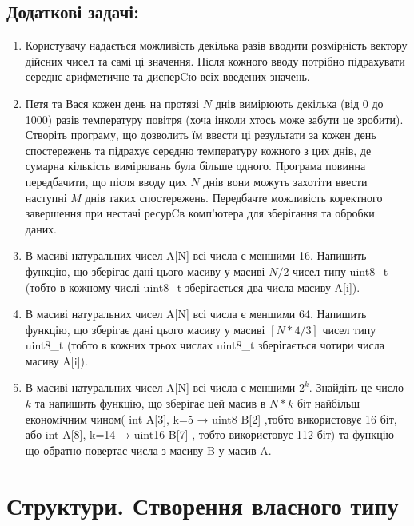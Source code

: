 \documentclass[a5paper,titlepage,openany,twoside,draft]{book_unv}%
\begin{document}
\section{Додаткові задачі:}

\begin{enumerate}
\def\labelenumi{\arabic{enumi})}
\setcounter{enumi}{8}
\item
  Користувачу надається можливість декілька разів вводити розмірність
  вектору дійсних чисел та самі ці значення. Після кожного вводу
  потрібно підрахувати середнє арифметичне та дисперCю всіх введених
  значень.
\item
  Петя та Вася кожен день на протязі $N$ днів вимірюють
  декілька (від 0 до 1000) разів температуру повітря (хоча інколи хтось
  може забути це зробити). Створіть програму, що дозволить їм ввести ці
  результати за кожен день спостережень та підрахує середню температуру
  кожного з цих днів, де сумарна кількість вимірювань була більше одного.
  Програма повинна передбачити, що після вводу цих $N$ днів вони можуть
  захотіти ввести наступні $M$ днів таких спостережень. Передбачте
  можливість коректного завершення при нестачі ресурCв комп'ютера для
  зберігання та обробки даних.
\item
 В масиві натуральних чисел A{[}N{]} всі числа є меншими 16. Напишить
  функцію, що зберігає дані цього масиву у масиві $N/2$ чисел типу
  uint8\_t (тобто в кожному числі uint8\_t зберігається два числа масиву
  A{[}i{]}).
\item
  В масиві натуральних чисел A{[}N{]} всі числа є меншими 64. Напишить
  функцію, що зберігає дані цього масиву у масиві $[N*4/3]$ чисел типу
  uint8\_t (тобто в кожних трьох числах uint8\_t зберігається чотири
  числа масиву A{[}i{]}).
\item
  В масиві натуральних чисел A{[}N{]} всі числа є меншими \(2^{k}\).
  Знайдіть це число $k$ та напишить функцію, що зберігає цей масив в $N*k$
  біт найбільш економічним чином( int A{[}3{]}, k=5 → uint8 B{[}2{]}
  ,тобто використовує 16 біт, або int A{[}8{]}, k=14 → uint16 B{[}7{]} ,
  тобто використовує 112 біт) та функцію що обратно повертає числа з
  масиву B у масив A.
\end{enumerate}



\chapter{Структури. Створення власного типу}
%
\end{document}
